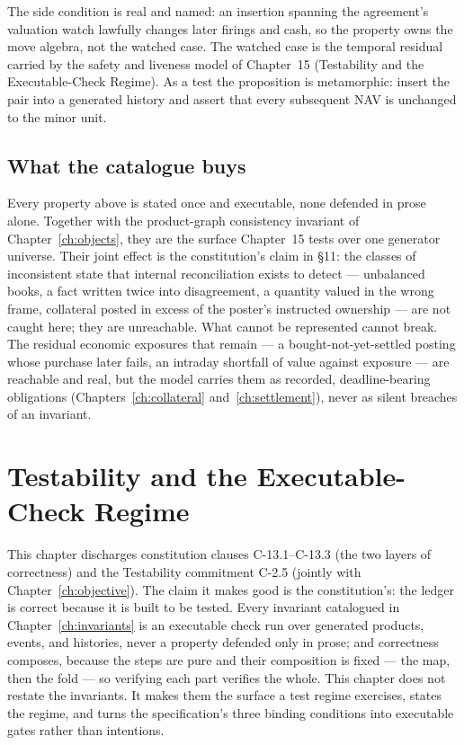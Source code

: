 \documentclass[11pt,a4paper]{article}
\begin{document}
The side condition is real and named: an insertion spanning the agreement's
valuation watch lawfully changes later firings and cash, so the property owns the
move algebra, not the watched case. The watched case is the temporal residual
carried by the safety and liveness model of Chapter~15 (Testability and the
Executable-Check Regime). As a test the proposition is metamorphic: insert the
pair into a generated history and assert that every subsequent NAV is unchanged to
the minor unit.

\subsection{What the catalogue buys}

Every property above is stated once and executable, none defended in prose alone.
Together with the product-graph consistency invariant of
Chapter~\ref{ch:objects}, they are the surface Chapter~15 tests over one
generator universe. Their joint effect is the constitution's claim in \S 11: the
classes of inconsistent state that internal reconciliation exists to detect ---
unbalanced books, a fact written twice into disagreement, a quantity valued in the
wrong frame, collateral posted in excess of the poster's instructed ownership --- are
not caught here; they are unreachable. What cannot be represented cannot break. The
residual economic exposures that remain --- a bought-not-yet-settled posting whose
purchase later fails, an intraday shortfall of value against exposure --- are reachable
and real, but the model carries them as recorded, deadline-bearing obligations
(Chapters~\ref{ch:collateral} and~\ref{ch:settlement}), never as silent breaches of an
invariant.

\section{Testability and the Executable-Check Regime}\label{ch:testability}

This chapter discharges constitution clauses C-13.1--C-13.3 (the two layers of correctness) and the Testability commitment C-2.5 (jointly with Chapter~\ref{ch:objective}). The claim it makes good is the constitution's: the
ledger is correct because it is built to be tested. Every invariant catalogued in
Chapter~\ref{ch:invariants} is an executable check run over generated products, events, and
histories, never a property defended only in prose; and correctness composes, because the
steps are pure and their composition is fixed --- the map, then the fold --- so verifying
each part verifies the whole. This chapter does not restate the invariants. It makes them
the surface a test regime exercises, states the regime, and turns the specification's three
binding conditions into executable gates rather than intentions.
\end{document}
